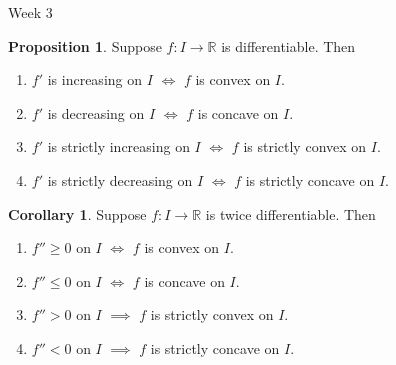 \documentclass[handout, dvipsnames]{beamer}
\theoremstyle{definition}
\newtheorem{prop}{Proposition}
\newtheorem{cor}{Corollary}
\begin{document}
\begin{frame}{Week 3}
    \begin{prop}
        Suppose $f: I \to \mathbb{R}$ is differentiable. Then
        \begin{enumerate}
            \item $f'$ is increasing on $I$ $\iff$ $f$ is convex on $I.$
            \item $f'$ is decreasing on $I$ $\iff$ $f$ is concave on $I.$
            \item $f'$ is strictly increasing on $I$ $\iff$ $f$ is strictly convex on $I.$
            \item $f'$ is strictly decreasing on $I$ $\iff$ $f$ is strictly concave on $I.$
        \end{enumerate}
    \end{prop}
    \begin{cor}
        Suppose $f: I \to \mathbb{R}$ is {\color{red}twice} differentiable. Then
        \begin{enumerate}
            \item $f''\ge 0$ on $I$ $\iff$ $f$ is convex on $I.$
            \item $f''\le 0$ on $I$ $\iff$ $f$ is concave on $I.$
            \item $f''> 0$ on $I$ $\implies$ $f$ is strictly convex on $I.$
            \item $f''< 0$ on $I$ $\implies$ $f$ is strictly concave on $I.$
        \end{enumerate}
    \end{cor}
\end{frame}
\end{document}
